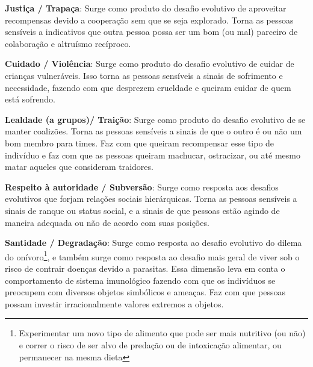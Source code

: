 \begin{description}
\item \textbf{Justiça / Trapaça}: Surge como produto do desafio evolutivo de
aproveitar recompensas devido a cooperação sem que se seja explorado. Torna as
pessoas sensíveis a indicativos que outra pessoa possa ser um bom (ou mal)
parceiro de colaboração e altruísmo recíproco.

\item \textbf{Cuidado / Violência}: Surge como produto do desafio evolutivo 
de cuidar de crianças vulneráveis. Isso torna as pessoas sensíveis a sinais 
de sofrimento e necessidade, fazendo com que desprezem crueldade e queiram 
cuidar de quem está sofrendo. 

\item \textbf{Lealdade (a grupos)/ Traição}: Surge como produto do desafio
evolutivo de se manter coalizões. Torna as pessoas sensíveis a sinais de que o
outro é ou não um bom membro para times. Faz com que queiram recompensar esse
tipo de indivíduo e faz com que as pessoas queiram machucar, ostracizar, ou
até mesmo matar aqueles que consideram traidores.

\item \textbf{Respeito à autoridade / Subversão}: Surge como resposta aos
desafios evolutivos que forjam relações sociais hierárquicas. Torna as pessoas
sensíveis a sinais de ranque ou status social, e a sinais de que pessoas estão
agindo de maneira adequada ou não de acordo com suas posições.

\item \textbf{Santidade / Degradação}: Surge como resposta ao desafio
evolutivo do dilema do onívoro\footnote{ Experimentar um novo tipo de
alimento que pode ser mais nutritivo (ou não) e correr o risco de ser alvo
de predação ou de intoxicação alimentar, ou permanecer na mesma dieta},
e também surge como resposta ao desafio mais geral de viver sob o risco
de contrair doenças devido a parasitas. Essa dimensão leva em conta o
comportamento de sistema imunológico fazendo com que os indivíduos se
preocupem com diversos objetos simbólicos e ameaças. Faz com que pessoas
possam investir irracionalmente valores extremos a objetos.
\end{description}

